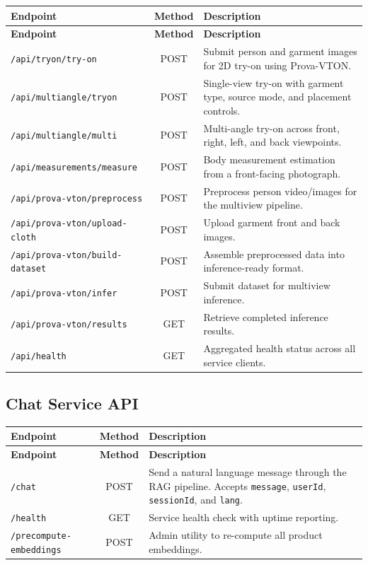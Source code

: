 \begin{longtable}{l c p{8cm}}
\toprule
\textbf{Endpoint} & \textbf{Method} & \textbf{Description} \\
\midrule
\endfirsthead
\toprule
\textbf{Endpoint} & \textbf{Method} & \textbf{Description} \\
\midrule
\endhead
\bottomrule
\endfoot

\texttt{/api/tryon/try-on} & POST & Submit person and garment images for 2D try-on using Prova-VTON. \\
\texttt{/api/multiangle/tryon} & POST & Single-view try-on with garment type, source mode, and placement controls. \\
\texttt{/api/multiangle/multi} & POST & Multi-angle try-on across front, right, left, and back viewpoints. \\
\texttt{/api/measurements/measure} & POST & Body measurement estimation from a front-facing photograph. \\
\texttt{/api/prova-vton/preprocess} & POST & Preprocess person video/images for the multiview pipeline. \\
\texttt{/api/prova-vton/upload-cloth} & POST & Upload garment front and back images. \\
\texttt{/api/prova-vton/build-dataset} & POST & Assemble preprocessed data into inference-ready format. \\
\texttt{/api/prova-vton/infer} & POST & Submit dataset for multiview inference. \\
\texttt{/api/prova-vton/results} & GET & Retrieve completed inference results. \\
\texttt{/api/health} & GET & Aggregated health status across all service clients. \\
\end{longtable}

\subsection{Chat Service API}
\begin{longtable}{l c p{8cm}}
\toprule
\textbf{Endpoint} & \textbf{Method} & \textbf{Description} \\
\midrule
\endfirsthead
\toprule
\textbf{Endpoint} & \textbf{Method} & \textbf{Description} \\
\midrule
\endhead
\bottomrule
\endfoot

\texttt{/chat} & POST & Send a natural language message through the RAG pipeline. Accepts \texttt{message}, \texttt{userId}, \texttt{sessionId}, and \texttt{lang}. \\
\texttt{/health} & GET & Service health check with uptime reporting. \\
\texttt{/precompute-embeddings} & POST & Admin utility to re-compute all product embeddings. \\
\end{longtable}

